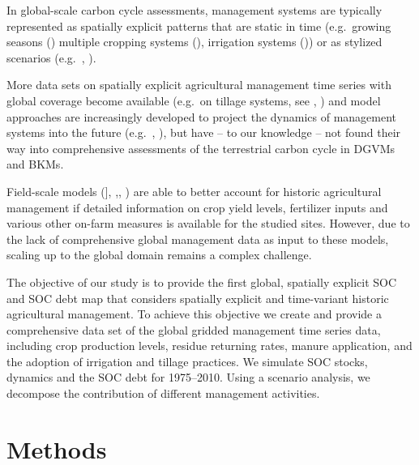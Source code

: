 \documentclass[gc, manuscript]{copernicus}
\begin{document}
In global-scale carbon cycle assessments, management systems are typically represented as spatially explicit patterns that are static in time (e.g.~growing seasons (\citep{portmann_mirca2000global_2010}) multiple cropping systems (\citep{waha_multiple_2020}), irrigation systems (\citep{jagermeyr_water_2015})) or as stylized scenarios (e.g.~\citep{pugh_simulated_2015}, \citep{lutz_simulating_2019}).

More data sets on spatially explicit agricultural management time series with global coverage become available (e.g.~on tillage systems, see \citep{porwollik_generating_2018}, \citep{prestele_spatially_2018}) and model approaches are increasingly developed to project the dynamics of management systems into the future (e.g.~\citep{iizumi_modeling_2019}, \citep{minoli_modelling_2019}), but have -- to our knowledge -- not found their way into comprehensive assessments of the terrestrial carbon cycle in DGVMs and BKMs.

Field-scale models (\citet{del_grosso_simulated_2001}{]}, \citep{coleman_simulating_1997},\citep{smith_estimating_2010}, \citep{taghizadeh-toosi_c-tool_2014}) are able to better account for historic agricultural management if detailed information on crop yield levels, fertilizer inputs and various other on-farm measures is available for the studied sites. However, due to the lack of comprehensive global management data as input to these models, scaling up to the global domain remains a complex challenge.

The objective of our study is to provide the first global, spatially explicit SOC and SOC debt map that considers spatially explicit and time-variant historic agricultural management. To achieve this objective we create and provide a comprehensive data set of the global gridded management time series data, including crop production levels, residue returning rates, manure application, and the adoption of irrigation and tillage practices. We simulate SOC stocks, dynamics and the SOC debt for 1975--2010. Using a scenario analysis, we decompose the contribution of different management activities.
\newpage

\hypertarget{methods}{%
\section{Methods}\label{methods}}
\end{document}
